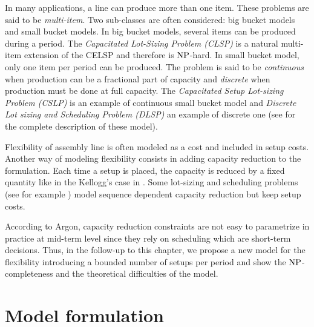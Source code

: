 \medskip

In many applications, a line can produce more than one item.
These problems are said to be \emph{multi-item}.
Two sub-classes are often considered: big bucket models and small bucket models.
In big bucket models, several items can be produced during a period.
The \emph{Capacitated Lot-Sizing Problem (CLSP)} is a natural multi-item extension of the CELSP and therefore is $\operatorname{NP}$-hard.
In small bucket model, only one item per period can be produced.
The problem is said to be \emph{continuous} when production can be a fractional part of capacity and \emph{discrete} when production must be done at full capacity.
The \emph{Capacitated Setup Lot-sizing Problem (CSLP)} is an example of continuous small bucket model and \emph{Discrete Lot sizing and Scheduling Problem (DLSP)} an example of discrete one (see \cite{Gicquel2008} for the complete description of these model).


\medskip


Flexibility of assembly line is often modeled as a cost and included in setup costs.
Another way of modeling flexibility consists in adding capacity reduction to the formulation.
Each time a setup is placed, the capacity is reduced by a fixed quantity like in the Kellogg's case in \cite[Chapter 4]{Pochet2006}.
Some lot-sizing and scheduling problems (see for example \cite{Guimaraes2014}) model sequence dependent capacity reduction but keep setup costs.



\medskip


According to Argon, capacity reduction constraints are not easy to parametrize in practice at mid-term level since they rely on scheduling which are short-term decisions.
Thus, in the follow-up to this chapter, we propose a new model for the flexibility introducing a bounded number of setups per period and show the $\operatorname{NP}$-completeness and the theoretical difficulties of the model.




\section{Model formulation}
\label{sec:PDP:deterministic:model}


